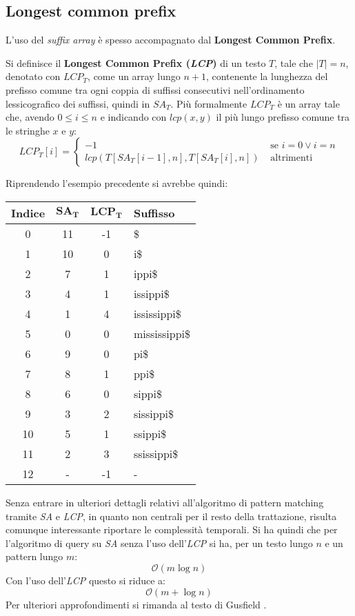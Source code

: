 \subsection{Longest common prefix}
L'uso del \textit{suffix array} è spesso accompagnato dal \textbf{Longest Common
  Prefix}.
\begin{definizione}
  Si definisce il \textbf{Longest Common Prefix (\emph{LCP})} di un testo $T$,
  tale che $|T|=n$,
  denotato con $LCP_T$, come un array lungo $n+1$, contenente la
  lunghezza del prefisso comune tra ogni coppia di suffissi consecutivi
  nell'ordinamento lessicografico dei suffissi, quindi in $SA_T$. Più formalmente
  $LCP_T$ è un array tale che, avendo $0\leq i\leq n$ e indicando con $lcp(x,y)$
  il più lungo prefisso comune tra le stringhe $x$ e $y$:
  \[LCP_T[i]=
    \begin{cases}
      -1&\mbox{ se } i=0 \lor i=n\\
      lcp(T[SA_T[i-1], n],T[SA_T [i], n])&\mbox{ altrimenti}
    \end{cases}
  \]
\end{definizione}
\begin{esempio}
  Riprendendo l'esempio precedente si avrebbe quindi:
  \begin{table}[H]
    \centering
    \footnotesize
    \begin{tabular}{c|c|c|l} 
      \textbf{Indice} & $\mathbf{SA_T}$ & $\mathbf{LCP_T}$ & \textbf{Suffisso}\\ 
      \hline
      0 & 11 & -1 & \$\\
      1 & 10 & 0 & i\$\\
      2 & 7 & 1 & ippi\$\\
      3 & 4 & 1 & issippi\$\\
      4 & 1 & 4 & ississippi\$\\
      5 & 0 & 0 & mississippi\$\\
      6 & 9 & 0 & pi\$\\
      7 & 8 & 1 & ppi\$\\
      8 & 6 & 0 & sippi\$\\
      9 & 3 & 2 & sissippi\$\\
      10 & 5 & 1 & ssippi\$\\
      11 & 2 & 3 & ssissippi\$\\
      12 & - & -1 & -
    \end{tabular}
  \end{table}
\end{esempio}
Senza entrare in ulteriori dettagli relativi all'algoritmo di pattern matching
tramite \textit{SA} e \textit{LCP}, in quanto non centrali per il resto della
trattazione, risulta comunque interessante riportare le complessità
temporali. Si ha quindi che per l'algoritmo di query su \textit{SA} senza l'uso
dell'\textit{LCP} si ha, per un testo lungo $n$ e un pattern lungo $m$:
\[\mathcal{O}(m\log n)\]
Con l'uso dell'\textit{LCP} questo si riduce a:
\[\mathcal{O}(m+\log n)\]
Per ulteriori approfondimenti si rimanda al testo di Gusfield
\cite{gusfield1997}.
